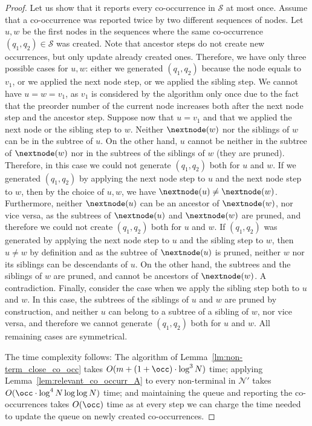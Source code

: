 \begin{proof}
Let us show that it reports every co-occurrence in $\mathcal{S}$ at most once. Assume that a co-occurrence was reported twice by two different sequences of nodes. 
Let $u,w$ be the first nodes in the sequences where the same co-occurrence $(q_1,q_2) \in \mathcal{S}$ was created. Note that ancestor steps do not create new occurrences, but only update already created ones. Therefore, we have only three possible cases for $u,w$: either we generated $(q_1,q_2)$ because the node equals to $v_1$, or we applied the next node step, or we applied the sibling step. We cannot have $u = w = v_1$, as $v_1$ is considered by the algorithm only once due to the fact that the preorder number of the current node increases both after the next node step and the ancestor step. Suppose now that $u = v_1$ and that we applied the next node or the sibling step to $w$. Neither $\nextnode(w)$ nor the siblings of $w$ can be in the subtree of $u$. On the other hand, $u$ cannot be neither in the subtree of $\nextnode(w)$ nor in the subtrees of the siblings of $w$ (they are pruned). Therefore, in this case we could not generate $(q_1,q_2)$ both for $u$ and $w$. If we generated $(q_1,q_2)$ by applying the next node step to $u$ and the next node step to $w$, then by the choice of $u,w$, we have $\nextnode(u)\neq \nextnode(w)$. Furthermore, neither $\nextnode(u)$ can be an ancestor of $\nextnode(w)$, nor vice versa, as the subtrees of $\nextnode(u)$ and $\nextnode(w)$ are pruned, and therefore we could not create $(q_1,q_2)$ both for $u$ and $w$. If $(q_1,q_2)$ was generated by applying the next node step to $u$ and the sibling step to $w$, then $u \neq w$ by definition and as the subtree of $\nextnode(u)$ is pruned, neither $w$ nor its siblings can be descendants of $u$. On the other hand, the subtrees and the siblings of $w$ are pruned, and cannot be ancestors of $\nextnode(w)$. A contradiction. Finally, consider the case when we apply the sibling step both to $u$ and $w$. In this case, the subtrees of the siblings of $u$ and $w$ are pruned by construction, and neither $u$ can belong to a subtree of a sibling of $w$, nor vice versa, and therefore we cannot generate $(q_1,q_2)$ both for $u$ and $w$. All remaining cases are symmetrical.  

The time complexity follows: The algorithm of Lemma~\ref{lm:non-term_close_co_occ} takes $O(m +(1+\occ) \cdot \log^3 N)$ time; applying Lemma~\ref{lem:relevant_co_occurr_A} to every non-terminal in $\mathcal{N}'$ takes $O(\occ \cdot \log^{4} N\log\log N)$ time; and maintaining the queue and reporting the co-occurrences takes $O(\occ)$ time as at every step we can charge the time needed to update the queue on newly created co-occurrences. 
\end{proof}

